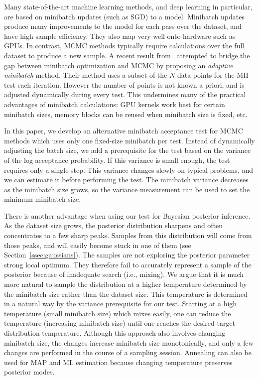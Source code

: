 \documentclass{article}
\begin{document}
Many state-of-the-art machine learning methods, and deep learning in
particular, are based on minibatch updates (such as SGD) to a model.
Minibatch updates produce many improvements to the model for each pass
over the dataset, and have high sample efficiency. They also map very
well onto hardware such as GPUs. In contrast, MCMC methods typically
require calculations over the full dataset to produce a new sample. A
recent result from~\cite{cutting_mh_2014} attempted to bridge the gap
between minibatch optimization and MCMC by proposing an \emph{adaptive
  minibatch} method. Their method uses a subset of the $N$ data points
for the MH test each iteration. However the number of points is not
known a priori, and is adjusted dynamically during every test. This
undermines many of the practical advantages of minibatch calculations: 
GPU kernels work best for certain minibatch sizes, memory blocks
can be reused when minibatch size is fixed, etc. 

In this paper, we develop an alternative minibatch acceptance test for MCMC
methods which uses only one fixed-size minibatch per test. Instead of
dynamically adjusting the batch size, we add a prerequisite for the test
based on the variance of the log acceptance probability. If this
variance is small enough, the test requires only a single step. This
variance changes slowly on typical problems, and we can estimate it
before performing the test. The minibatch variance
decreases as the minibatch size grows, so the variance measurement can be
used to set the minimum minibatch size.

There is another advantage when using our test for Bayesian
posterior inference. As the dataset size grows, the posterior distribution
sharpens and often concentrates to a few sharp peaks. Samples from
this distribution will come from those peaks, and will easily become
stuck in one of them (see Section~\ref{ssec:gaussians}).  The samples are not exploring
the posterior parameter %
strong local optimum. They therefore fail to accurately represent a
sample of the posterior because of inadequate search (i.e.,
mixing). We argue that it is much more natural to sample the
distribution at a higher temperature determined by the
minibatch size rather than the dataset size. This temperature is
determined in a natural way by the variance prerequisite for our
test. Starting at a high temperature (small minibatch size) which
mixes easily, one can reduce the temperature (increasing minibatch
size) until one reaches the desired target distribution temperature.
Although this approach also involves changing minibatch size, the
changes increase minibatch size monotonically, and only a few changes
are performed in the course of a sampling session.
Annealing can also be used for MAP and ML estimation because changing temperature preserves
posterior modes. 
\end{document}

